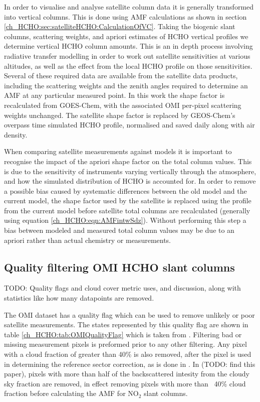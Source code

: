     In order to visualise and analyse satellite column data it is generally transformed into vertical columns. 
    This is done using AMF calculations as shown in section \ref{ch_HCHO:sec:satelliteHCHO:CalculationOfVC}.
    Taking the biogenic slant columns, scattering weights, and apriori estimates of HCHO vertical profiles we determine vertical HCHO column amounts.
    This is an in depth process involving radiative transfer modelling in order to work out satellite sensitivities at various altitudes, as well as the effect from the local HCHO profile on those sensitivities.
    Several of these required data are available from the satellite data products, including the scattering weights and the zenith angles required to determine an AMF at any particular measured point.
    In this work the shape factor is recalculated from GOES-Chem, with the associated OMI per-pixel scattering weights unchanged. 
    The satellite shape factor is replaced by GEOS-Chem's overpass time simulated HCHO profile, normalised and saved daily along with air density.
    
    When comparing satellite measurements against models it is important to recognise the impact of the apriori shape factor on the total column values.
    This is due to the sensitivity of instruments varying vertically through the atmosphere, and how the simulated distribution of HCHO is accounted for.
    In order to remove a possible bias caused by systematic differences between the old model and the current model, the shape factor used by the satellite is replaced using the profile from the current model before satellite total columns are recalculated (generally using equation \ref{ch_HCHO:eqn:AMFintwSdz}).
    Without performing this step a bias between modeled and measured total column values may be due to an apriori rather than actual chemistry or measurements.

  \subsection{Quality filtering OMI HCHO slant columns}
    \label{ch_HCHO:sec:OMIFiltering}
    TODO: Quality flags and cloud cover metric uses, and discussion, along with statistics like how many datapoints are removed.
    
    The OMI dataset has a quality flag which can be used to remove unlikely or poor satellite measurements.
    The states represented by this quality flag are shown in table \ref{ch_HCHO:tab:OMIQualityFlag} which is taken from \citet{Kurosu2014}.
    Filtering bad or missing measurement pixels is preformed prior to any other filtering.
    Any pixel with a cloud fraction of greater than 40\% is also removed, after the pixel is used in determining the reference sector correction, as is done in \citet{Abad2015, DeSmedt2015}.
    In \citet{Martin2003} (TODO: find this paper), pixels with more than half of the backscattered intesity from the cloudy sky fraction are removed, in effect removing pixels with more than ~40\% cloud fraction before calculating the AMF for NO$_2$ slant columns. 
    
